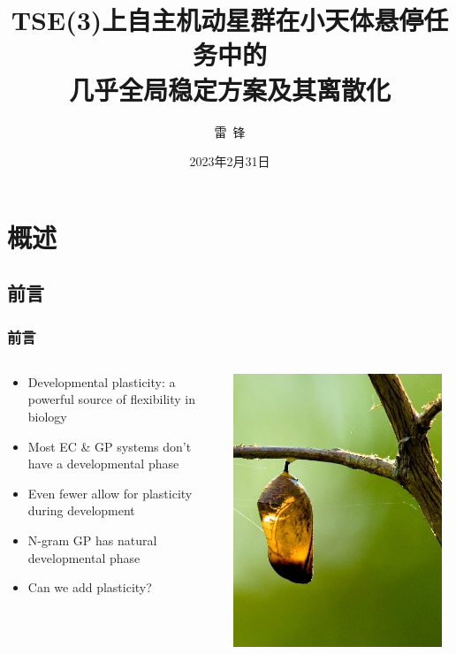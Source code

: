 \documentclass{beamer}
\title[\textbf{学术报告}]{TSE(3)\textbf{上自主机动星群在小天体悬停任务中的\\几乎全局稳定方案及其离散化}}
\author[\textbf{雷~锋}]{雷~锋}
\institute[]
{
  哈尔滨工业大学  航天学院\\
  \linespace
  某某技术研究所 \\
}
\date{2023年2月31日}
\begin{document}
\begin{frame}
  \titlepage
\end{frame}


\section*{\textbf{概述}}

\subsection*{\textbf{前言}}

\begin{frame}
  \frametitle{\textbf{前言}}
  
  \begin{columns}
  \begin{column}{0.6\textwidth}
  \begin{itemize}
  	\item Developmental plasticity: a powerful source of flexibility in biology
	\item Most EC \& GP systems don't have a developmental phase
	\item Even fewer allow for plasticity during development
	\item N-gram GP has natural developmental phase
	\item Can we add plasticity?
  \end{itemize}
  \end{column}
  \begin{column}{0.4\textwidth}
   \includegraphics[width=0.95\textwidth]{Fig/FigA.jpg}

\end{column}
\end{columns}
\end{frame}
\end{document}
